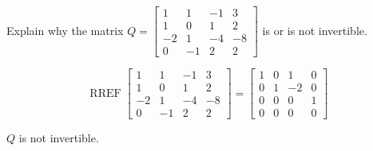 
\begin{exerciseStatement}


Explain why the matrix \(Q= \left[\begin{array}{cccc}
1 & 1 & -1 & 3 \\
1 & 0 & 1 & 2 \\
-2 & 1 & -4 & -8 \\
0 & -1 & 2 & 2
\end{array}\right] \) is or is not invertible.


\end{exerciseStatement}
    
\begin{exerciseAnswer} 


\[\operatorname{RREF} \left[\begin{array}{cccc}
1 & 1 & -1 & 3 \\
1 & 0 & 1 & 2 \\
-2 & 1 & -4 & -8 \\
0 & -1 & 2 & 2
\end{array}\right] = \left[\begin{array}{cccc}
1 & 0 & 1 & 0 \\
0 & 1 & -2 & 0 \\
0 & 0 & 0 & 1 \\
0 & 0 & 0 & 0
\end{array}\right] \]

\(Q\) is not invertible.
\end{exerciseAnswer}
    
